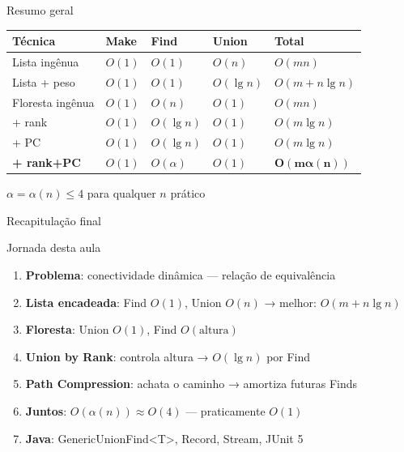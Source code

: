 \documentclass[aspectratio=169]{beamer}
\begin{document}
\begin{frame}{Resumo geral}%
  \begin{center}
  \renewcommand{\arraystretch}{1.35}
  \begin{tabular}{lllll}
    \toprule
    \textbf{Técnica} & \textbf{Make} & \textbf{Find} & \textbf{Union} & \textbf{Total} \\
    \midrule
    Lista ingênua      & $O(1)$ & $O(1)$     & $O(n)$         & $O(mn)$ \\
    Lista + peso       & $O(1)$ & $O(1)$     & $O(\lg n)$     & $O(m{+}n\lg n)$ \\
    Floresta ingênua   & $O(1)$ & $O(n)$     & $O(1)$         & $O(mn)$ \\
    + rank             & $O(1)$ & $O(\lg n)$ & $O(1)$         & $O(m\lg n)$ \\
    + PC               & $O(1)$ & $O(\lg n)$ & $O(1)$         & $O(m\lg n)$ \\
    \textbf{+ rank+PC} & $O(1)$ & $O(\alpha)$& $O(1)$ & $\mathbf{O(m\alpha(n))}$ \\
    \bottomrule
  \end{tabular}
  \end{center}
  \vspace{0.2cm}
  \begin{center}
    \small$\alpha = \alpha(n) \leq 4$ para qualquer $n$ prático
  \end{center}
\end{frame}

\begin{frame}{Recapitulação final}%
  \begin{block}{Jornada desta aula}
    \begin{enumerate}
      \item \textbf{Problema}: conectividade dinâmica — relação de equivalência
      \item \textbf{Lista encadeada}: Find $O(1)$, Union $O(n)$ → melhor: $O(m{+}n\lg n)$
      \item \textbf{Floresta}: Union $O(1)$, Find $O(\text{altura})$
      \item \textbf{Union by Rank}: controla altura → $O(\lg n)$ por Find
      \item \textbf{Path Compression}: achata o caminho → amortiza futuras Finds
      \item \textbf{Juntos}: $O(\alpha(n)) \approx O(4)$ — praticamente $O(1)$
      \item \textbf{Java}: GenericUnionFind<T>, Record, Stream, JUnit 5
    \end{enumerate}
  \end{block}
\end{frame}
\end{document}

